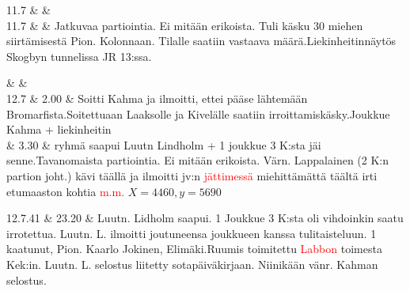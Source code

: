 \documentclass[11pt,a5paper,oneside]{book}
\begin{document}
11.7 & & \newline\newline\newline\newline\newline \\

11.7 & & Jatkuvaa partiointia. Ei mitään erikoista. Tuli käsku 30 miehen siirtämisestä Pion. Kolonnaan. Tilalle saatiin vastaava määrä.\newline Liekinheitinnäytös Skogbyn tunnelissa JR 13:ssa.\\ 
\newpage

& & \newline\newline\newline\newline\newline\newline \\

12.7 & 2.00 & Soitti Kahma ja ilmoitti, ettei pääse lähtemään Bromarfista.\newline Soitettuaan Laaksolle ja Kivelälle saatiin irroittamiskäsky.\newline Joukkue Kahma + liekinheitin \\

& 3.30 & ryhmä saapui \newline Luutn Lindholm + 1 joukkue 3 K:sta jäi senne.\newline\newline Tavanomaista partiointia. Ei mitään erikoista. Värn. Lappalainen (2 K:n partion joht.) kävi täällä ja ilmoitti jv:n \textcolor{red}{jättimessä} miehittämättä täältä irti etumaaston kohtia \textcolor{red}{m.m.} $X=4460, y=5690$ \\

\taulustop


12.7.41 & 23.20 & Luutn. Lidholm saapui. 1 Joukkue 3 K:sta oli vihdoinkin saatu irrotettua. Luutn. L. ilmoitti joutuneensa joukkueen kanssa tulitaisteluun. 1 kaatunut, \newline Pion. Kaarlo Jokinen, Elimäki.\newline Ruumis toimitettu \textcolor{red}{Labbon} toimesta Kek:in. Luutn. L. selostus liitetty sotapäiväkirjaan. Niinikään vänr. Kahman selostus.\newline\newline\newline\newline\newline \\ 
\end{document}
